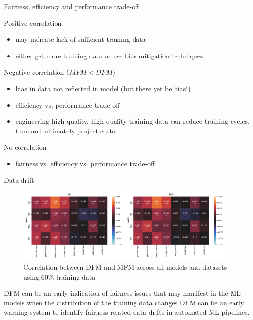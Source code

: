 \documentclass[aspectratio=169]{beamer}
\begin{document}
\begin{frame}{Fairness, efficiency and performance trade-off}
  \begin{exampleblock}{Positive correlation}
    \begin{itemize}
      \item may indicate lack of sufficient training data
      \item either get more training data or use bias mitigation
        techniques
    \end{itemize}
  \end{exampleblock}

  \begin{alertblock}{Negative correlation ($MFM<DFM$)}
    \begin{itemize}
      \item bias in data not reflected in model (but there yet be
        bias!)
      \item efficiency vs. performance trade-off
      \item engineering high quality, high quality training data can
        \textcolor{example}{reduce} training cycles, time and
        ultimately project costs.
    \end{itemize}
  \end{alertblock}

  \begin{block}{No correlation}
    \begin{itemize}
      \item fairness vs. efficiency vs. performance trade-off
    \end{itemize}
  \end{block}
\end{frame}

\begin{frame}{Data drift}
  \begin{figure}
    \centering
    \includegraphics[width=0.95\linewidth]{heatmap--corr--training-sets-frac.pdf}
    \caption{Correlation between DFM and MFM across all models and
      datasets using 60\% training data}
  \end{figure}

  \begin{exampleblock}{DFM can be an early indication of fairness
    issues that may manifest in the ML models when the distribution of
    the training data changes}
    DFM can be an early warning system to identify fairness related
    data drifts in automated ML pipelines.
  \end{exampleblock}
\end{frame}
\end{document}
